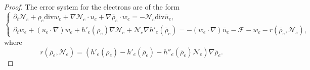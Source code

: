 \documentclass[reqno,twoside,12pt,a4paper]{amsart}
\newcommand{\dive}{\mathrm{div}}
\newcommand{\pt}{\partial_t}
\numberwithin{equation}{section}
\begin{document}
\begin{proof} The error system for the electrons are of the form
\begin{equation*}
\begin{cases}
 \pt \mathcal{N}_e +\rho_e \dive w_e+\nabla\mathcal{N}_e\cdot u_e+\nabla\bar{\rho}_e\cdot w_e=- \mathcal{N}_e \dive\bar{u}_e,\\
 \pt w_e+(u_e \cdot \nabla) w_e+h'_e(\rho_e)\nabla\mathcal{N}_e+\mathcal{N}_e\nabla h'_e(\bar{\rho}_e)=-(w_e \cdot \nabla) \bar{u}_e
     -\mathcal{F}-w_e-r(\bar{\rho}_e,\mathcal{N}_e),
\end{cases}    
\end{equation*}
where
\begin{equation*}
    r(\bar{\rho}_e,\mathcal{N}_e)=(h'_e(\rho_e)-h'_e(\bar{\rho}_e)-h''_e(\bar{\rho}_e)\mathcal{N}_e)\nabla \bar{\rho}_e.
\end{equation*}


\end{proof}
\end{document}
